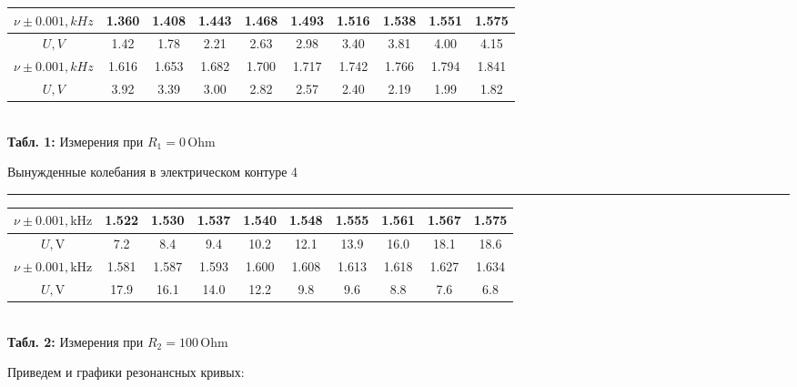 \documentclass[12pt,a4paper]{scrartcl}
\begin{document}
	\begin{center}
		\begin{tabular}{|c|c|c|c|c|c|c|c|c|c|}
			\hline $\nu \pm 0.001, kHz$ & 1.360 & 1.408 & 1.443 & 1.468 & 1.493 & 1.516 & 1.538 & 1.551 & 1.575
			\\\hline $U, V$ & 1.42 & 1.78 & 2.21 & 2.63 & 2.98 & 3.40 & 3.81 & 4.00 & 4.15
			\\\hline $\nu \pm 0.001, kHz$ & 1.616 & 1.653 & 1.682 & 1.700 & 1.717 & 1.742 & 1.766 & 1.794 & 1.841
			\\\hline $U, V$ & 3.92 & 3.39 & 3.00 & 2.82 & 2.57 & 2.40 & 2.19 & 1.99 & 1.82
			\\\hline
		\end{tabular}
		\\\textbf{Табл. 1:} Измерения при $R_1 = 0\, \mathrm{Ohm}$
	\end{center}
	
	\newpage
	
	
	\begin{flushleft}
		\footnotesize{Вынужденные колебания в электрическом контуре} \hspace{\fill} \footnotesize{4}
		\\[-0.3cm]\noindent\rule{\textwidth}{0.3pt}
	\end{flushleft}

	\begin{center}
		\begin{tabular}{|c|c|c|c|c|c|c|c|c|c|}
			\hline $\nu \pm 0.001, \mathrm{kHz}$ & 1.522 & 1.530 & 1.537 & 1.540 & 1.548 & 1.555 & 1.561 & 1.567 & 1.575
			\\\hline $U, \mathrm{V}$ & 7.2 & 8.4 & 9.4 & 10.2 & 12.1 & 13.9 & 16.0 & 18.1 & 18.6
			\\\hline $\nu \pm 0.001, \mathrm{kHz}$ & 1.581 & 1.587 & 1.593 & 1.600 & 1.608 & 1.613 & 1.618 & 1.627 & 1.634
			\\\hline $U, \mathrm{V}$ & 17.9 & 16.1 & 14.0 & 12.2 & 9.8 & 9.6 & 8.8 & 7.6 & 6.8
			\\\hline
		\end{tabular}
		\\\textbf{Табл. 2:} Измерения при $R_2 = 100\, \mathrm{Ohm}$
	\end{center}
	
	Приведем и графики резонансных кривых:
	
\end{document}
